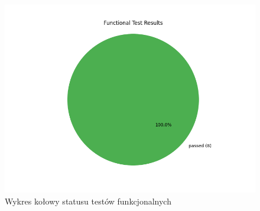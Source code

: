 \documentclass[12pt,a4paper]{article}
\begin{document}
\begin{enumerate}
        \begin{figure}[H]
            \centering
                \includegraphics[width=0.8\linewidth]{media/wykresy/pie_functional_test.png}
            \caption{Wykres kołowy statusu testów funkcjonalnych}
            \label{fig:enter-label}
        \end{figure}


\end{enumerate}
\end{document}
